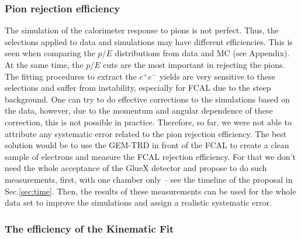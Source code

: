 \documentclass[%
preprint,
nofootinbib,
 amsmath,amssymb,
 aps,
floatfix,
]{revtex4-1}
\begin{document}
\subsubsection{Pion rejection efficiency}
The simulation of the calorimeter response to pions is not perfect.
Thus, the selections applied to data and simulations may have
different efficiencies. 
This is seen when comparing the $p/E$ distributions from data and MC 
(see Appendix).
At the same time, the $p/E$ cuts are the most important in rejecting the pions.
The fitting procedures to extract the $e^+e^-$ yields are very sensitive
to these selections and suffer from instability, 
especially for FCAL due to the steep background.
One can try to do effective corrections to the simulations based on the data,
however, due to the momentum and angular dependence of these correction,
this is not possible in practice.
Therefore, so far, we were not able to attribute any systematic error
related to the pion rejection efficiency.
The best solution would be to use the GEM-TRD in front of the FCAL to create
a clean sample of electrons and measure the FCAL rejection efficiency.
For that we don't need the whole acceptance of the GlueX detector
and propose to do such measurements, first, with one chamber only 
-- see the timeline of the proposal in Sec.\ref{sec:time}.
Then, the results of these measurements can be used for the whole data set
to improve the simulations and assign a realistic systematic error.

\subsubsection{The efficiency of the Kinematic Fit}
\end{document}
